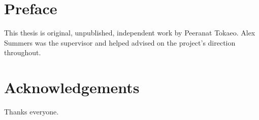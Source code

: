 \documentclass[msc,oneside]{ubcthesis}
\theoremstyle{definition}
\begin{document}
\chapter{Preface} %
This thesis is original, unpublished, independent work by Peeranat Tokaeo. Alex Summers was the supervisor and helped advised on the project's direction throughout.


\tableofcontents                %
\listoftables                   %
\listoffigures                  %

\chapter{Acknowledgements}      %
Thanks everyone.


\end{document}
